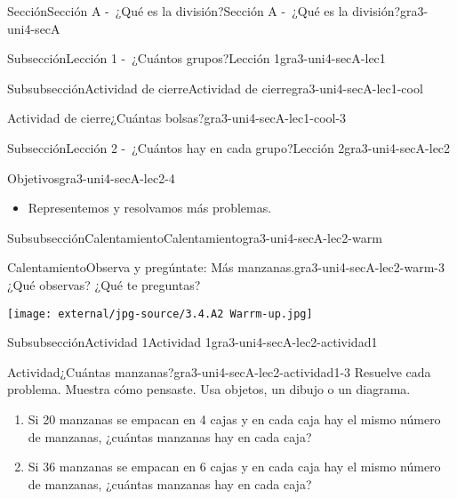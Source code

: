 \documentclass[twoside,14pt,]{extarticle}
\begin{document}
\begin{sectionptx}{Sección}{Sección A -~¿Qué es la división?}{}{Sección A -~¿Qué es la división?}{}{}{gra3-uni4-secA}
\begin{subsectionptx}{Subsección}{Lección 1 -~¿Cuántos grupos?}{}{Lección 1}{}{}{gra3-uni4-secA-lec1}
\begin{subsubsectionptx}{Subsubsección}{Actividad de cierre}{}{Actividad de cierre}{}{}{gra3-uni4-secA-lec1-cool}
\begin{project}{Actividad de cierre}{¿Cuántas bolsas?}{gra3-uni4-secA-lec1-cool-3}
\end{project}%
\end{subsubsectionptx}
\end{subsectionptx}
%
%
\typeout{************************************************}
\typeout{************************************************}
%
\begin{subsectionptx}{Subsección}{Lección 2 -~¿Cuántos hay en cada grupo?}{}{Lección 2}{}{}{gra3-uni4-secA-lec2}
\begin{objectives}{Objetivos}{gra3-uni4-secA-lec2-4}
%
\begin{itemize}[label=\textbullet]
\item{}Representemos y resolvamos más problemas.%
\end{itemize}
\end{objectives}
%
%
\typeout{************************************************}
\typeout{************************************************}
%
\begin{subsubsectionptx}{Subsubsección}{Calentamiento}{}{Calentamiento}{}{}{gra3-uni4-secA-lec2-warm}
\begin{exploration}{Calentamiento}{Observa y pregúntate: Más manzanas.}{gra3-uni4-secA-lec2-warm-3}%
¿Qué observas? ¿Qué te preguntas?%
\begin{image}{0}{1}{0}{}%
\texttt{[image: external/jpg-source/3.4.A2 Warrm-up.jpg]}
\end{image}%
\end{exploration}%
\end{subsubsectionptx}
%
%
\typeout{************************************************}
\typeout{************************************************}
%
\begin{subsubsectionptx}{Subsubsección}{Actividad 1}{}{Actividad 1}{}{}{gra3-uni4-secA-lec2-actividad1}
\begin{activity}{Actividad}{¿Cuántas manzanas?}{gra3-uni4-secA-lec2-actividad1-3}%
Resuelve cada problema. Muestra cómo pensaste. Usa objetos, un dibujo o un diagrama.%
\par
%
\begin{enumerate}
\item{}Si 20 manzanas se empacan en 4 cajas y en cada caja hay el mismo número de manzanas, ¿cuántas manzanas hay en cada caja?%
\item{}Si 36 manzanas se empacan en 6 cajas y en cada caja hay el mismo número de manzanas, ¿cuántas manzanas hay en cada caja?%

\end{enumerate}
\end{activity}
\end{subsubsectionptx}
\end{subsectionptx}
\end{sectionptx}
\end{document}
